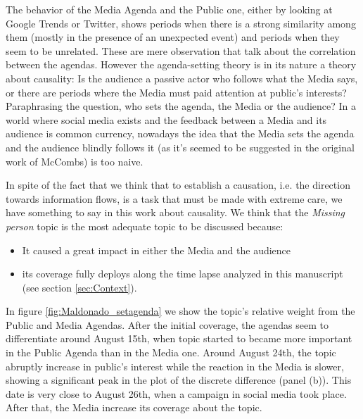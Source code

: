 \documentclass{bmcart}
\begin{document}
\par The behavior of the Media Agenda and the Public one, either by looking at Google Trends or Twitter, shows periods when there is a strong similarity among them (mostly in the presence of an unexpected event) and periods when they seem to be unrelated. These are mere observation that talk about the correlation between the agendas.
However the agenda-setting theory is in its nature a theory about causality: Is the audience a passive actor who follows what the Media says, or there are periods where the Media must paid attention at public's interests?
Paraphrasing the question, who sets the agenda, the Media or the audience?
In a world where social media exists and the feedback between a Media and its audience is common currency, nowadays the idea that the Media sets the agenda and the audience blindly follows it (as it's seemed to be suggested in the original work of McCombs) is too naive.
 
\par In spite of the fact that we think that to establish a causation, i.e. the direction towards information flows, is a task that must be made with extreme care, we have something to say in this work about causality. 
We think that the \emph{Missing person} topic is the most adequate topic to be discussed because:
\begin{itemize} 
\item It caused a great impact in either the Media and the audience
\item  its coverage fully deploys along the time lapse analyzed in this manuscript (see section \ref{sec:Context}).
\end{itemize}

\par In figure \ref{fig:Maldonado_setagenda} we show the topic's relative weight from the Public and Media Agendas.  After the initial coverage, the agendas seem to differentiate around August 15th, when topic started to became more important in the Public Agenda than in the Media one. Around August 24th, the topic abruptly increase in public's interest while the reaction in the Media is slower, showing a significant peak in the plot of the discrete difference (panel (b)). This date is very close to August 26th, when a campaign in social media took place. After that, the Media increase its coverage about the topic. 
\end{document}
